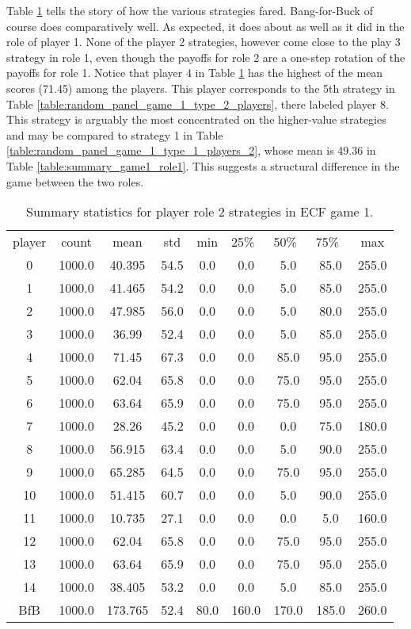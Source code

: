 \documentclass[11pt, oneside]{article}   	%
\begin{document}
\clearpage\newpage

Table \ref{table:summary_game1_role2} tells the story of how the various strategies fared. Bang-for-Buck of course does comparatively well. As expected, it does about as well as it did in the role of player 1. None of the player 2 strategies, however come close to the play 3 strategy in role 1, even though the payoffs for role 2 are a one-step rotation of the  payoffs for role 1. Notice that player 4 in Table \ref{table:summary_game1_role2} has the highest of the mean scores (71.45) among the players. This player corresponds to the 5th strategy in Table \ref{table:random_panel_game_1_type_2_players}, there labeled player 8. This strategy is arguably the most concentrated on the higher-value strategies and may be compared to 
strategy 1 in Table \ref{table:random_panel_game_1_type_1_players_2}, whose mean is 49.36 in Table \ref{table:summary_game1_role1}. This suggests a structural difference in the game between the two roles.
\begin{table}[h]
\figtop

\centering
\begin{tabular}{ccccccccc}
 player & count & mean & std & min & 25\%\ & 50\%\ & 75\%\ & max \\ 
0 & 1000.0 & 40.395 & 54.5 & 0.0 & 0.0 & 5.0 & 85.0 & 255.0 \\ 
1 & 1000.0 & 41.465 & 54.2 & 0.0 & 0.0 & 5.0 & 85.0 & 255.0 \\ 
2 & 1000.0 & 47.985 & 56.0 & 0.0 & 0.0 & 5.0 & 80.0 & 255.0 \\ 
3 & 1000.0 & 36.99 & 52.4 & 0.0 & 0.0 & 5.0 & 85.0 & 255.0 \\ 
4 & 1000.0 & 71.45 & 67.3 & 0.0 & 0.0 & 85.0 & 95.0 & 255.0 \\ 
5 & 1000.0 & 62.04 & 65.8 & 0.0 & 0.0 & 75.0 & 95.0 & 255.0 \\ 
6 & 1000.0 & 63.64 & 65.9 & 0.0 & 0.0 & 75.0 & 95.0 & 255.0 \\ 
7 & 1000.0 & 28.26 & 45.2 & 0.0 & 0.0 & 0.0 & 75.0 & 180.0 \\ 
8 & 1000.0 & 56.915 & 63.4 & 0.0 & 0.0 & 5.0 & 90.0 & 255.0 \\ 
9 & 1000.0 & 65.285 & 64.5 & 0.0 & 0.0 & 75.0 & 95.0 & 255.0 \\ 
10 & 1000.0 & 51.415 & 60.7 & 0.0 & 0.0 & 5.0 & 90.0 & 255.0 \\ 
11 & 1000.0 & 10.735 & 27.1 & 0.0 & 0.0 & 0.0 & 5.0 & 160.0 \\ 
12 & 1000.0 & 62.04 & 65.8 & 0.0 & 0.0 & 75.0 & 95.0 & 255.0 \\ 
13 & 1000.0 & 63.64 & 65.9 & 0.0 & 0.0 & 75.0 & 95.0 & 255.0 \\ 
14 & 1000.0 & 38.405 & 53.2 & 0.0 & 0.0 & 5.0 & 85.0 & 255.0 \\ 
BfB & 1000.0 & 173.765 & 52.4 & 80.0 & 160.0 & 170.0 & 185.0 & 260.0 \\ 
 \end{tabular}
\caption{Summary statistics for player role 2 strategies in ECF game 1.}
\label{table:summary_game1_role2}
\figbot
\end{table}
\end{document}
